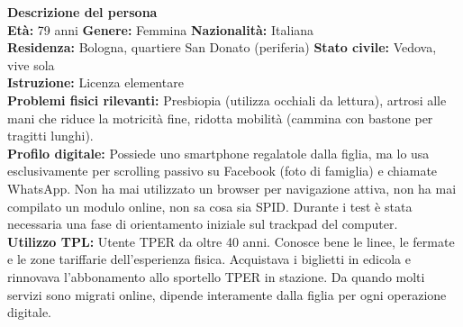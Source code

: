 \documentclass[11pt,a4paper]{article}
\begin{document}
\begin{tcolorbox}[colback=backgroundColor,colframe=borderColor,arc=2mm]
    \textbf{Descrizione del persona} \\[4pt]
    {\small
    \textbf{Età:} 79 anni \hfill
    \textbf{Genere:} Femmina \hfill
    \textbf{Nazionalità:} Italiana \\[2pt]
    \textbf{Residenza:} Bologna, quartiere San Donato (periferia) \hfill
    \textbf{Stato civile:} Vedova, vive sola \\[2pt]
    \textbf{Istruzione:} Licenza elementare \\[2pt]
    \textbf{Problemi fisici rilevanti:} Presbiopia (utilizza occhiali da lettura), artrosi alle mani che riduce la motricità fine, ridotta mobilità (cammina con bastone per tragitti lunghi). \\[2pt]
    \textbf{Profilo digitale:} Possiede uno smartphone regalatole dalla figlia, ma lo usa esclusivamente per scrolling passivo su Facebook (foto di famiglia) e chiamate WhatsApp. Non ha mai utilizzato un browser per navigazione attiva, non ha mai compilato un modulo online, non sa cosa sia SPID. Durante i test è stata necessaria una fase di orientamento iniziale sul trackpad del computer. \\[2pt]
    \textbf{Utilizzo TPL:} Utente TPER da oltre 40 anni. Conosce bene le linee, le fermate e le zone tariffarie dell'esperienza fisica. Acquistava i biglietti in edicola e rinnovava l'abbonamento allo sportello TPER in stazione. Da quando molti servizi sono migrati online, dipende interamente dalla figlia per ogni operazione digitale.
    }
\end{tcolorbox}

\end{document}
